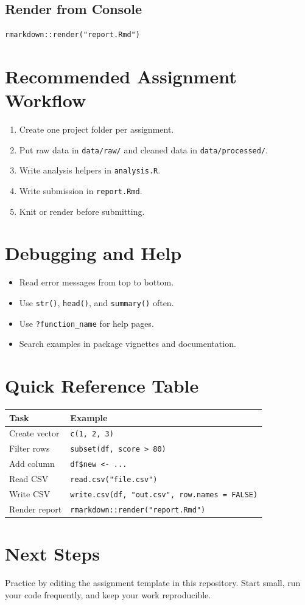 \documentclass[11pt]{article}
\begin{document}
\subsection{Render from Console}
\begin{verbatim}
rmarkdown::render("report.Rmd")
\end{verbatim}

\section{Recommended Assignment Workflow}
\begin{enumerate}[leftmargin=*]
  \item Create one project folder per assignment.
  \item Put raw data in \texttt{data/raw/} and cleaned data in \texttt{data/processed/}.
  \item Write analysis helpers in \texttt{analysis.R}.
  \item Write submission in \texttt{report.Rmd}.
  \item Knit or render before submitting.
\end{enumerate}

\section{Debugging and Help}
\begin{itemize}[leftmargin=*]
  \item Read error messages from top to bottom.
  \item Use \texttt{str()}, \texttt{head()}, and \texttt{summary()} often.
  \item Use \texttt{?function\_name} for help pages.
  \item Search examples in package vignettes and documentation.
\end{itemize}

\section{Quick Reference Table}
\begin{center}
\begin{tabular}{ll}
\toprule
Task & Example \\
\midrule
Create vector & \texttt{c(1, 2, 3)} \\
Filter rows & \texttt{subset(df, score > 80)} \\
Add column & \texttt{df\$new <- ...} \\
Read CSV & \texttt{read.csv("file.csv")} \\
Write CSV & \texttt{write.csv(df, "out.csv", row.names = FALSE)} \\
Render report & \texttt{rmarkdown::render("report.Rmd")} \\
\bottomrule
\end{tabular}
\end{center}

\section{Next Steps}
Practice by editing the assignment template in this repository. Start small, run your code frequently, and keep your work reproducible.
\end{document}
